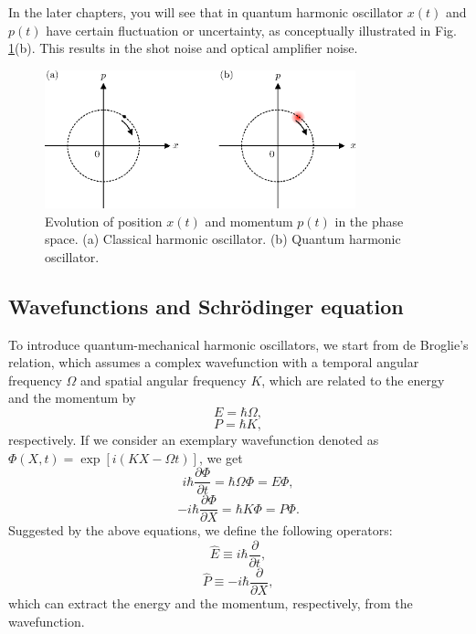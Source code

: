 \documentclass{book}
\begin{document}
In the later chapters, you will see that in quantum harmonic oscillator $x(t)$ and $p(t)$ have certain fluctuation or uncertainty, as conceptually illustrated in Fig. {\ref{fig:classical_phase_space}}(b). This results in the shot noise and optical amplifier noise.

\begin{figure}
  \centering
  \includegraphics[width=9cm]{fig/3-1_phase_space.eps} 
  \caption{Evolution of position $x(t)$ and momentum $p(t)$ in the phase space. (a) Classical harmonic oscillator. (b) Quantum harmonic oscillator. }
  \label{fig:classical_phase_space}
\end{figure}


\subsection{Wavefunctions and Schr\"odinger equation}
To introduce quantum-mechanical harmonic oscillators, we start from de Broglie's relation, which assumes a complex wavefunction with a temporal angular frequency $\Omega$ and spatial angular frequency $K$, which are related to the energy and the momentum by
\begin{equation}
  E = \hbar \Omega,
\end{equation}
\begin{equation}
  P = \hbar K,
\end{equation}
respectively. If we consider an exemplary wavefunction denoted as $\Phi(X, t)= \exp[i(KX-\Omega t)]$, we get 
\begin{equation}
 i\hbar\frac{\partial\Phi}{\partial t} = \hbar\Omega \Phi = E\Phi,
\end{equation}
\begin{equation}
-i\hbar \frac {\partial \Phi}{\partial X} = \hbar K\Phi = P\Phi.
\end{equation}
Suggested by the above equations, we define the following operators:
\begin{equation}
	\hat E \equiv i\hbar \frac{\partial}{\partial t}, 
 \label{eq:energy_operator}
\end{equation}
\begin{equation}
  \hat P \equiv -i\hbar \frac{\partial}{\partial X},
  \label{eq:momentum_operator}
\end{equation}
which can extract the energy and the momentum, respectively, from the wavefunction.
\end{document}
